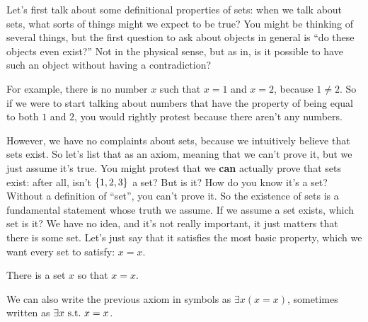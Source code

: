 Let's first talk about some definitional properties of sets: when we talk about sets, what sorts of things might we expect to be true?
You might be thinking of several things, but the first question to ask about objects in general is ``do these objects even exist?''
Not in the physical sense, but as in, is it possible to have such an object without having a contradiction?

For example, there is no number $x$ such that $x = 1$ and $x = 2$, because $1 \neq 2$.
So if we were to start talking about numbers that have the property of being equal to both $1$ and $2$, you would rightly protest because there aren't any numbers.

However, we have no complaints about sets, because we intuitively believe that sets exist.
So let's list that as an axiom, meaning that we can't prove it, but we just assume it's true.
You might protest that we \textbf{can} actually prove that sets exist: after all, isn't ${\left\{ {1,2,3} \right\}}$ a set?
But is it?
How do you know it's a set?
Without a definition of ``set'', you can't prove it.
So the existence of sets is a fundamental statement whose truth we assume.
If we assume a set exists, which set is it?
We have no idea, and it's not really important, it just matters that there is some set.
Let's just say that it satisfies the most basic property, which we want every set to satisfy: $x = x$.

\begin{axiom}[Existence]
    There is a set $x$ so that $x = x$.
\end{axiom}

We can also write the previous axiom in symbols as $\exists x (x = x)$, sometimes written as $\exists x ~\text{s.t.}~ x = x$.

